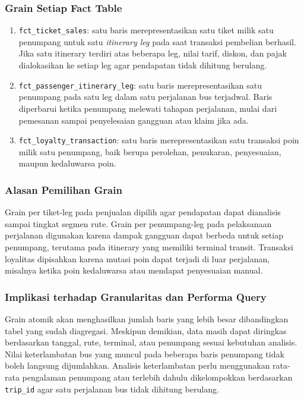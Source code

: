 \subsubsection{Grain Setiap Fact Table}

\begin{enumerate}[label=\alph*., leftmargin=*, topsep=0pt, itemsep=0.5em,
    parsep=0pt, partopsep=0pt, before=\vspace{-\parskip}]
    \item \texttt{fct\_ticket\_sales}: satu baris merepresentasikan satu tiket milik
    satu penumpang untuk satu \textit{itinerary leg} pada saat transaksi pembelian
    berhasil. Jika satu itinerary terdiri atas beberapa leg, nilai tarif, diskon,
    dan pajak dialokasikan ke setiap leg agar pendapatan tidak dihitung berulang.
    \item \texttt{fct\_passenger\_itinerary\_leg}: satu baris merepresentasikan satu
    penumpang pada satu leg dalam satu perjalanan bus terjadwal. Baris diperbarui
    ketika penumpang melewati tahapan perjalanan, mulai dari pemesanan sampai
    penyelesaian gangguan atau klaim jika ada.
    \item \texttt{fct\_loyalty\_transaction}: satu baris merepresentasikan satu
    transaksi poin milik satu penumpang, baik berupa perolehan, penukaran,
    penyesuaian, maupun kedaluwarsa poin.
\end{enumerate}

\subsubsection{Alasan Pemilihan Grain}

Grain per tiket-leg pada penjualan dipilih agar pendapatan dapat dianalisis sampai
tingkat segmen rute. Grain per penumpang-leg pada pelaksanaan perjalanan digunakan
karena dampak gangguan dapat berbeda untuk setiap penumpang, terutama pada itinerary
yang memiliki terminal transit. Transaksi loyalitas dipisahkan karena mutasi poin
dapat terjadi di luar perjalanan, misalnya ketika poin kedaluwarsa atau mendapat
penyesuaian manual.

\subsubsection{Implikasi terhadap Granularitas dan Performa Query}

Grain atomik akan menghasilkan jumlah baris yang lebih besar dibandingkan tabel
yang sudah diagregasi. Meskipun demikian, data masih dapat diringkas berdasarkan
tanggal, rute, terminal, atau penumpang sesuai kebutuhan analisis. Nilai keterlambatan
bus yang muncul pada beberapa baris penumpang tidak boleh langsung dijumlahkan.
Analisis keterlambatan perlu menggunakan rata-rata pengalaman penumpang atau terlebih
dahulu dikelompokkan berdasarkan \texttt{trip\_id} agar satu perjalanan bus tidak
dihitung berulang.

